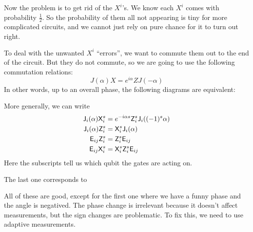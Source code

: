 Now the problem is to get rid of the $X^i$'s. We know each $X^i$ comes with probability $\frac{1}{2}$. So the probability of them all not appearing is tiny for more complicated circuits, and we cannot just rely on pure chance for it to turn out right.

To deal with the unwanted $X^i$ ``errors'', we want to commute them out to the end of the circuit. But they do not commute, so we are going to use the following commutation relations:
\[
  J(\alpha) X = e^{i\alpha} Z J(-\alpha)
\]
In other words, up to an overall phase, the following diagrams are equivalent:
\begin{center}
  \raisebox{-0.5\height}{is equivalent to}
\end{center}
More generally, we can write
\begin{align*}
  \mathsf{J}_i(\alpha) \mathsf{X}_i^s &= e^{-i\alpha s} \mathsf{Z}_i^s \mathsf{J}_i((-1)^s \alpha)\\
  \mathsf{J}_i(\alpha) \mathsf{Z}_i^s &= \mathsf{X}_i^s \mathsf{J}_i(\alpha)\\
  \mathsf{E}_{ij}\mathsf{Z}_i^s &= \mathsf{Z}_i^s \mathsf{E}_{ij}\\
  \mathsf{E}_{ij} \mathsf{X}_i^s &= \mathsf{X}_i^s \mathsf{Z}_i^s \mathsf{E}_{ij}
\end{align*}
Here the subscripts tell us which qubit the gates are acting on.

The last one corresponds to
\begin{center}
\end{center}
All of these are good, except for the first one where we have a funny phase and the angle is negatived. The phase change is irrelevant because it doesn't affect measurements, but the sign changes are problematic. To fix this, we need to use adaptive measurements.

